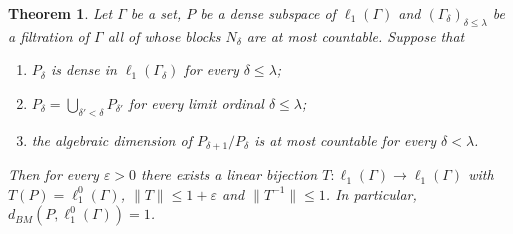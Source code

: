 \documentclass[12pt]{article}
\newtheorem{theorem}{Theorem}[section]
\newcommand{\lo}[1]{\ell_1^0(#1)}
\newcommand{\ellone}[1]{\ell_1(#1)}
\newcommand{\norm}[1]{\lVert #1\rVert}
\newcommand{\BM}{d_{BM}}
\begin{document}
\begin{theorem}\label{TransfiniteBackAndForth} Let $\Gamma$ be a set, $P$ be
    a dense subspace of $\ellone{\Gamma}$ and ${(\Gamma_\delta)}_{\delta\leq\lambda}$
    be a filtration of $\Gamma$ all of whose blocks $N_\delta$ are at most
    countable. Suppose that
    \begin{enumerate}[label = (\roman*)]
        \item $P_\delta$ is dense in $\ellone{\Gamma_\delta}$ for every
              $\delta\leq\lambda$;
        \item $P_\delta=\bigcup_{\delta'<\delta}P_{\delta'}$ for every limit
              ordinal $\delta\leq\lambda$;
        \item the algebraic dimension of $P_{\delta+1}/P_\delta$ is at most
              countable for every $\delta<\lambda$.
    \end{enumerate}
    Then for every $\varepsilon>0$ there exists a linear bijection
    $T:\ellone{\Gamma}\to\ellone{\Gamma}$ with $T(P)=\lo{\Gamma}$,
    $\norm{T}\leq 1+\varepsilon$ and $\norm{T^{-1}}\leq 1$. In particular,
    $\BM(P,\lo{\Gamma})=1$.
\end{theorem}
\end{document}
